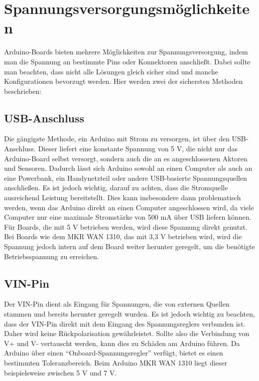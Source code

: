 \section{Spannungsversorgungsmöglichkeiten}

	Arduino-Boards bieten mehrere Möglichkeiten zur Spannungsversorgung, indem man die Spannung an bestimmte Pins oder Konnektoren anschließt. Dabei sollte man beachten, dass nicht alle Lösungen gleich sicher sind und manche Konfigurationen bevorzugt werden\cite{Bagur:2025}. Hier werden zwei der sichersten Methoden beschrieben:
	
\subsection{USB-Anschluss}

	Die gängigste Methode, ein Arduino mit Strom zu versorgen, ist über den USB-Anschluss. Dieser liefert eine konstante Spannung von 5 V, die nicht nur das Arduino-Board selbst versorgt, sondern auch die an es angeschlossenen Aktoren und Sensoren. Dadurch lässt sich Arduino sowohl an einen Computer als auch an eine Powerbank, ein Handynetzteil oder andere USB-basierte Spannungsquellen anschließen. Es ist jedoch wichtig, darauf zu achten, dass die Stromquelle ausreichend Leistung bereitstellt. Dies kann insbesondere dann problematisch werden, wenn das Arduino direkt an einen Computer angeschlossen wird, da viele Computer nur eine maximale Stromstärke von 500 mA über USB liefern können.
	Für Boards, die mit 5 V betrieben werden, wird diese Spannung direkt genutzt. Bei Boards wie dem MKR WAN 1310, das mit 3,3 V betrieben wird, wird die Spannung jedoch intern auf dem Board weiter herunter geregelt, um die benötigte Betriebsspannung zu erreichen.
	
\subsection{VIN-Pin}

	Der VIN-Pin dient als Eingang für Spannungen, die von externen Quellen stammen und bereits herunter geregelt wurden. Es ist jedoch wichtig zu beachten, dass der VIN-Pin direkt mit dem Eingang des Spannungsreglers verbunden ist. Daher wird keine Rückpolarisation gewährleistet. Sollte also die Verbindung von V+ und V- vertauscht werden, kann dies zu Schäden am Arduino führen.
	Da Arduino über einen ``Onboard-Spannungsregler'' verfügt, bietet es einen bestimmten Toleranzbereich. Beim Arduino MKR WAN 1310 liegt dieser beispielsweise zwischen 5 V und 7 V.
	
